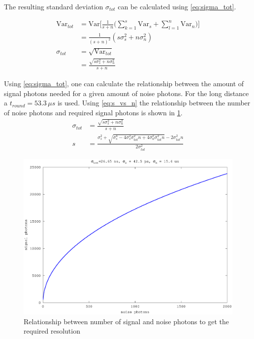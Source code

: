 The resulting standard deviation $\sigma_{tot}$ can be calculated using \cref{eq:sigma_tot}.

\begin{align}
\text{Var}_{tot} &= \text{Var}\Big[\frac{1}{s+n}\Big(\sum_{k=1}^s\text{Var}_s+\sum_{l=1}^n\text{Var}_n\Big)\Big]\\
&= \frac{1}{(s+n)^2}(s\sigma_s^2+n\sigma_n^2)\\
\sigma_{tot} &= \sqrt{\text{Var}_{tot}}\\
&= \frac{\sqrt{s\sigma_s^2+n\sigma_n^2}}{s+n} \label{eq:sigma_tot}
\end{align}

Using \cref{eq:sigma_tot}, one can calculate the relationship between the amount of signal photons needed for a given amount of noise photons. For the long distance a $t_{round}=53.3\,\mu s$ is used. Using \cref{eq:s_vs_n} the relationship between the number of noise photons and required signal photons is shown in \cref{fig:altimetry_s_vs_n_small}.
\begin{align}
\sigma_{tot} &= \frac{\sqrt{s\sigma_s^2+n\sigma_n^2}}{s+n} \\
s &= \frac{\sigma_s^2+\sqrt{\sigma_s^4-4\sigma_s^2\sigma_{tot}^2n+4\sigma_n^2\sigma_{tot}^2n}-2\sigma_{tot}^2n}{2\sigma_{tot}^2}\label{eq:s_vs_n}
\end{align} 

\begin{figure}[h]
\centering
	\includegraphics[width=0.8\linewidth]{fig/altimetry_s_vs_n_small.eps}
\caption{Relationship between number of signal and noise photons to get the required resolution}
\label{fig:altimetry_s_vs_n_small}
\end{figure}

